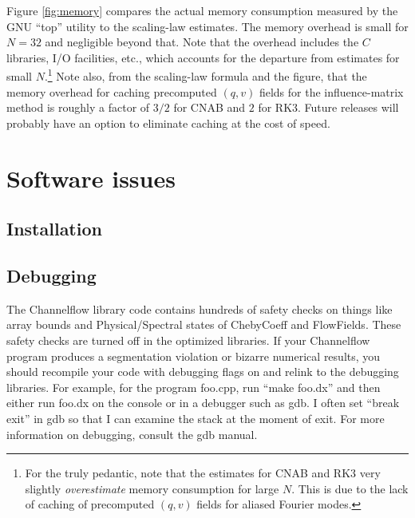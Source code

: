\documentclass{article}[12pt]
\begin{document}
Figure \ref{fig:memory} compares the actual memory consumption
measured by the GNU ``top'' utility to the scaling-law estimates. The
memory overhead is small for $N=32$ and negligible beyond that. Note
that the overhead includes the $C$ libraries, I/O facilities, etc.,
which accounts for the departure from estimates for small
$N$.\footnote{For the truly pedantic, note that the estimates for CNAB
and RK3 very slightly {\em overestimate} memory consumption for large
$N$. This is due to the lack of caching of precomputed $(q, v)$ fields
for aliased Fourier modes.} Note also, from the scaling-law formula
and the figure, that the memory overhead for caching precomputed $(q,
v)$ fields for the influence-matrix method is roughly a factor of
$3/2$ for CNAB and $2$ for RK3. Future releases will probably have an
option to eliminate caching at the cost of speed.

\section{Software issues}
\label{software}

\subsection{Installation}
\label{sec:installation}

\subsection{Debugging}
\label{sec:debugging}

The Channelflow library code contains hundreds of safety checks on things
like array bounds and Physical/Spectral states of ChebyCoeff and FlowFields.
These safety checks are turned off in the optimized libraries. If your
Channelflow program produces a segmentation violation or bizarre numerical
results, you should recompile your code with debugging flags on and relink
to the debugging libraries. For example, for the program foo.cpp,
run ``make foo.dx'' and then either run foo.dx on the console or in a
debugger such as gdb. I often set ``break exit'' in gdb so that I can
examine the stack at the moment of exit. For more information on debugging,
consult the gdb manual.



\end{document}
